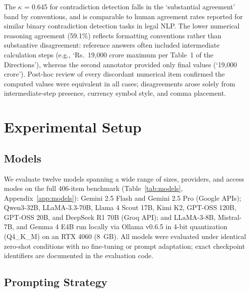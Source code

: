 \documentclass[11pt]{article}
\begin{document}
The $\kappa$ = 0.645 for contradiction detection falls in the `substantial agreement' band by \citet{landiskoch1977} conventions, and is comparable to human agreement rates reported for similar binary contradiction detection tasks in legal NLP. The lower numerical reasoning agreement (59.1\%) reflects formatting conventions rather than substantive disagreement: reference answers often included intermediate calculation steps (e.g., `Rs.~19,000 crore maximum per Table~1 of the Directions'), whereas the second annotator provided only final values (`19,000 crore'). Post-hoc review of every discordant numerical item confirmed the computed values were equivalent in all cases; disagreements arose solely from intermediate-step presence, currency symbol style, and comma placement.

\section{Experimental Setup}

\subsection{Models}

We evaluate twelve models spanning a wide range of sizes, providers, and access modes on the full 406-item benchmark (Table~\ref{tab:models}, Appendix~\ref{app:models}): Gemini 2.5 Flash and Gemini 2.5 Pro (Google APIs); Qwen3-32B, LLaMA-3.3-70B, Llama 4 Scout 17B, Kimi K2, GPT-OSS 120B, GPT-OSS 20B, and DeepSeek R1 70B (Groq API); and LLaMA-3-8B, Mistral-7B, and Gemma 4 E4B run locally via Ollama v0.6.5 in 4-bit quantization (Q4\_K\_M) on an RTX 4060 (8~GB). All models were evaluated under identical zero-shot conditions with no fine-tuning or prompt adaptation; exact checkpoint identifiers are documented in the evaluation code.

\subsection{Prompting Strategy}
\end{document}
